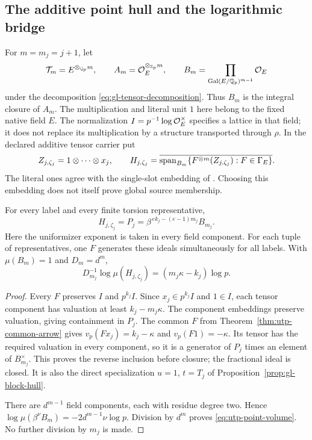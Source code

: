 \subsection{The additive point hull and the logarithmic bridge}

For $m=m_j=j+1$, let
\[
 \mathcal T_m=E^{\otimes_{\mathbb Q_p}m},\qquad
 A_m=\mathcal O_E^{\otimes_{\mathbb Z_p}m},\qquad
 B_m=\prod_{\operatorname{Gal}(E/\mathbb Q_p)^{m-1}}\mathcal O_E
\]
under the decomposition \eqref{eq:gl-tensor-decomposition}.
Thus $B_m$ is the integral closure of $A_m$.
The multiplication and literal unit $1$ here belong to the fixed
native field $E$. The normalization $I=p^{-1}\log\mathcal O_E^\times$
specifies a lattice in that field; it does not replace its
multiplication by a structure transported through $\rho$.
In the declared additive tensor carrier put
\begin{equation}\label{eq:utp-point-source}
 Z_{j,\zeta_j}=1\otimes\cdots\otimes x_j,\qquad
 H_{j,\zeta_j}=
 \overline{\operatorname{span}_{B_m}
   \{F^{\otimes m}(Z_{j,\zeta_j}):F\in\Gamma_E\}} .
\end{equation}
The literal ones agree with the single-slot embedding of
\cite[Proposition~3.1(ii), p.~93]{IUT3}. Choosing this
embedding does not itself prove global source membership.

\begin{theorem}\label{thm:utp-point-hull}
For every label and every finite torsion representative,
\begin{equation}\label{eq:utp-point-hull}
 H_{j,\zeta_j}=P_j
       =\beta^{\,e k_j-(e-1)m_j}B_{m_j}.
\end{equation}
Here the uniformizer exponent is taken in every field component.
For each tuple of representatives, one $F$ generates these
ideals simultaneously for all labels. With $\mu(B_m)=1$ and
$D_m=d^m$,
\begin{equation}\label{eq:utp-point-volume}
 D_{m_j}^{-1}\log\mu(H_{j,\zeta_j})
                       =(m_j\kappa-k_j)\log p .
\end{equation}
\end{theorem}
\begin{proof}
Every $F$ preserves $I$ and $p^{k_j}I$. Since
$x_j\in p^{k_j}I$ and $1\in I$, each tensor component
has valuation at least $k_j-m_j\kappa$. The component
embeddings preserve valuation, giving containment in $P_j$.
The common $F$ from Theorem~\ref{thm:utp-common-arrow} gives
$v_p(Fx_j)=k_j-\kappa$ and $v_p(F1)=-\kappa$.
Its tensor has the required valuation in every component,
so it is a generator of $P_j$ times an element of
$B_{m_j}^{\times}$. This proves the reverse inclusion
before closure; the fractional ideal is closed.
It is also the direct specialization $u=1$, $t=T_j$ of
Proposition~\ref{prop:gl-block-hull}.

There are $d^{m-1}$ field components, each with residue degree
two. Hence $\log\mu(\beta^\nu B_m)
=-2d^{m-1}\nu\log p$. Division by $d^m$ proves
\eqref{eq:utp-point-volume}. No further division by $m_j$
is made.
\end{proof}

